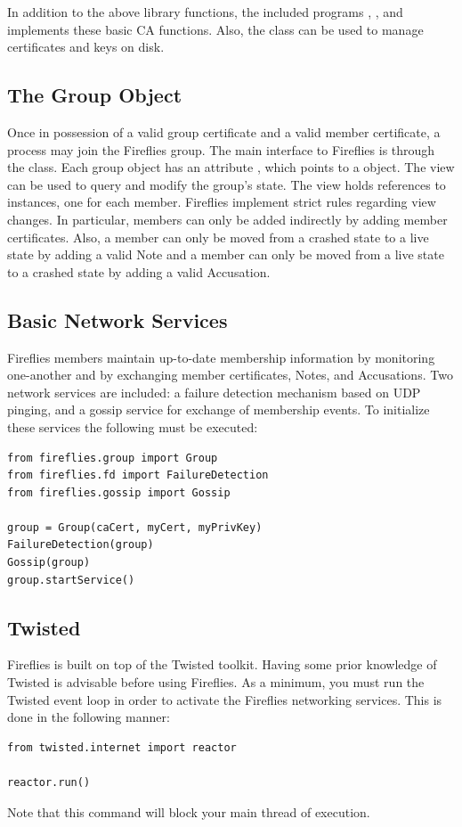 \documentclass{howto}
\begin{document}
In addition to the above library functions, the included programs
, , and  implements
these basic CA functions. Also, the 
class can be used to manage certificates and keys on disk.

\subsection{The Group Object}

Once in possession of a valid group certificate and a
valid member certificate, a process may join the Fireflies group.
The main interface to Fireflies is through the  class.
Each group object has an attribute , which points to a  object.
The view can be used to query and modify the group's state.
The view holds references to  instances, one for each member.
Fireflies implement strict rules regarding view changes. In particular, members can only be added indirectly by adding
member certificates. Also, a member can only be moved from a crashed state to a live state by adding a valid Note and a
 member can only be moved from a live state to a crashed state by adding a valid Accusation.


\subsection{Basic Network Services}

Fireflies members maintain up-to-date membership information by monitoring one-another and by
exchanging member certificates, Notes, and Accusations. Two network services are included: 
a failure detection mechanism based on UDP pinging, and a gossip service for exchange of membership events.
To initialize these services the following must be executed:

\begin{verbatim}
from fireflies.group import Group
from fireflies.fd import FailureDetection
from fireflies.gossip import Gossip

group = Group(caCert, myCert, myPrivKey)
FailureDetection(group)
Gossip(group)
group.startService()
\end{verbatim}


\subsection{Twisted}

Fireflies is built on top of the Twisted toolkit.  
Having some prior knowledge of Twisted is advisable before using Fireflies.
As a minimum, you must run the Twisted event loop in order to activate
the Fireflies networking services. This is done in the following manner:
%
\begin{verbatim}
from twisted.internet import reactor

reactor.run()
\end{verbatim}
%
Note that this command will block your main thread of execution. 
\end{document}
